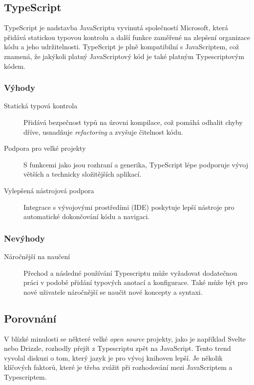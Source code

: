 \subsection{TypeScript}
TypeScript je nadstavba JavaScriptu vyvinutá společností Microsoft, která přidává statickou typovou kontrolu a další funkce zaměřené na zlepšení organizace kódu a jeho udržitelnosti. TypeScript je plně kompatibilní s JavaScriptem, což znamená, že jakýkoli platný JavaScriptový kód je také platným Typescriptovým kódem. \cite{TypeScript}

\subsubsection{Výhody}

\begin{description}
    \item[Statická typová kontrola] Přidává bezpečnost typů na úrovni kompilace, což pomáhá odhalit chyby dříve, usnadňuje \emph{refactoring} a zvyšuje čitelnost kódu.
    \item[Podpora pro velké projekty] S funkcemi jako jsou rozhraní a generika, TypeScript lépe podporuje vývoj větších a technicky složitějších aplikací.
    \item[Vylepšená nástrojová podpora] Integrace s vývojovými prostředími (IDE) poskytuje lepší nástroje pro automatické dokončování kódu a navigaci.
\end{description}

\subsubsection{Nevýhody}

\begin{description}
    \item[Náročnější na naučení] Přechod a následné používání Typescriptu může vyžadovat dodatečnou práci v podobě přidání typových anotací a konfigurace. Také může být pro nové uživatele náročnější se naučit nové koncepty a syntaxi.
\end{description}

\subsection{Porovnání}
V blízké minulosti se některé velké \emph{open source} projekty, jako je například Svelte nebo Drizzle, rozhodly přejít z Typescriptu zpět na JavaScript. Tento trend vyvolal diskuzi o tom, který jazyk je pro vývoj knihoven lepší. Je několik klíčových faktorů, které je třeba zvážit při rozhodování mezi JavaScriptem a Typescriptem.

